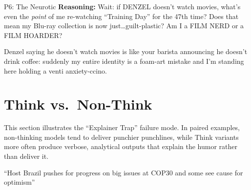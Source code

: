 \documentclass[11pt]{article}
\begin{document}
\vspace{0.9em}

\begin{personabox}[p6color]{P6: The Neurotic}
\textbf{Reasoning:} Wait: if DENZEL doesn't watch movies, what's even the \textit{point} of me re-watching ``Training Day'' for the 47th time? Does that mean my Blu-ray collection is now just\ldots guilt-plastic? Am I a FILM NERD or a FILM HOARDER?
\end{personabox}
\vspace{-1.2em}
\begin{jokebox}
Denzel saying he doesn't watch movies is like your barista announcing he doesn't drink coffee: suddenly my entire identity is a foam-art mistake and I'm standing here holding a venti anxiety-ccino.
\end{jokebox}




\section{Think vs.\ Non-Think}
\label{sec:appendix_think_vs_non_think}

This section illustrates the ``Explainer Trap'' failure mode. In paired examples, non-thinking models tend to deliver punchier punchlines, while Think variants more often produce verbose, analytical outputs that explain the humor rather than deliver it.

\vspace{0.5em}
\begin{inputbox}
``Host Brazil pushes for progress on big issues at COP30 and some see cause for optimism''
\end{inputbox}
\vspace{1em}

\end{document}
